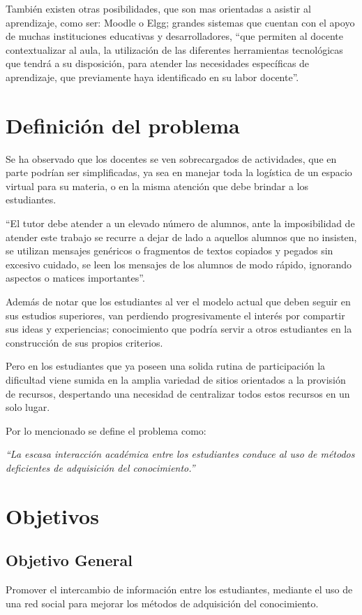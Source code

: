 También existen otras posibilidades, que son mas orientadas a asistir al
aprendizaje, como ser: Moodle o Elgg; grandes sistemas que cuentan con el apoyo
de muchas instituciones educativas y desarrolladores, “que permiten al docente
contextualizar al aula, la utilización de las diferentes herramientas
tecnológicas que tendrá a su disposición, para atender las  necesidades
específicas de aprendizaje, que previamente haya identificado en su labor
docente”\cite{Gonzalez}.

\section{Definición del problema}
Se ha observado que los docentes se ven sobrecargados de actividades, que en
parte podrían ser simplificadas, ya sea en manejar toda la logística de un
espacio virtual para su materia, o en la misma atención que debe brindar a los
estudiantes.

“El tutor debe atender a un elevado número de alumnos, ante la imposibilidad de
atender este trabajo se recurre a dejar de lado a aquellos alumnos que no
insisten, se utilizan mensajes genéricos o fragmentos de textos copiados y
pegados sin excesivo cuidado, se leen los mensajes de los alumnos de modo
rápido, ignorando aspectos o matices importantes”\cite{Bartolome}.

Además de notar que los estudiantes al ver el modelo actual que deben seguir en
sus estudios superiores, van perdiendo progresivamente el interés por compartir
sus ideas y experiencias; conocimiento que podría servir a otros estudiantes en
la construcción de sus propios criterios.

Pero en los estudiantes que ya poseen una solida rutina de participación la
dificultad viene sumida en la amplia variedad de sitios orientados a la
provisión de recursos, despertando una necesidad de centralizar todos estos
recursos en un solo lugar.

Por lo mencionado se define el problema como:

\emph{“La escasa interacción académica entre los estudiantes conduce al uso de
métodos deficientes de adquisición del conocimiento.”}

\section{Objetivos}

\subsection{Objetivo General}
Promover el intercambio de información entre los estudiantes, mediante el uso
de una red social para mejorar los métodos de adquisición del conocimiento.

